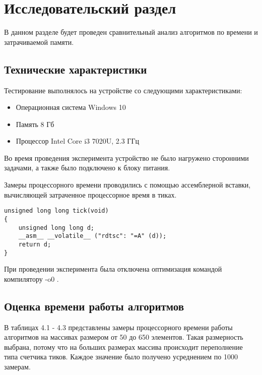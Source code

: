 \chapter{Исследовательский раздел}

В данном разделе будет проведен сравнительный анализ алгоритмов по
времени и затрачиваемой памяти.

\section{Технические характеристики}

Тестирование выполнялось на устройстве со следующими характеристиками: 

\begin{itemize}
	\item Операционная система Windows 10 \cite{windows10}
	\item Память 8 Гб
	\item Процессор Intel Core i3 7020U, 2.3 ГГц \cite{intel}
\end{itemize}

Во время проведения эксперимента устройство не было нагружено сторонними задачами, а также было подключено к блоку питания.

Замеры процессорного времени проводились с помощью ассемблерной вставки, вычисляющей затраченное процессорное время в тиках.

\begin{lstlisting}[label=tick, caption=Ассемблерная вставка замера процессорного времени в тиках]
unsigned long long tick(void)
{
    unsigned long long d;
    __asm__ __volatile__ ("rdtsc": "=A" (d));
    return d;
}
\end{lstlisting}

При проведении эксперимента была отключена оптимизация командой компилятору -o0 \cite{std=c99}.

\section{Оценка времени работы алгоритмов}

В таблицах 4.1 - 4.3 представлены замеры процессорного времени работы алгоритмов на массивах размером от 50 до 650 элементов. Такая размерность выбрана, потому что на больших размерах массива происходит переполнение типа счетчика тиков. Каждое значение было получено усреднением по 1000 замерам. 



